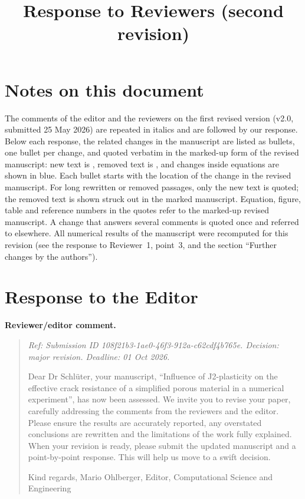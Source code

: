 \documentclass[pdflatex,sn-mathphys-num]{sn-jnl}
\title{Response to Reviewers (second revision)}
\author*[1]{\fnm{Alexander} \sur{Schl\"uter}}
\author[1]{\fnm{Ronjit} \sur{Medda}}
\author[1]{\fnm{Ralf} \sur{M\"uller}}
\affil*[1]{\orgdiv{Institut f\"ur Mechanik, FB Bau- und Umweltingenieurwissenschaften}, \orgname{TU Darmstadt},
  \orgaddress{\street{Franziska-Braun-Stra{\ss}e 7}, \city{Darmstadt}, \postcode{64287}, \country{Germany}}}
\newcommand{\changed}[1]{\begingroup\color{blue}#1\endgroup}
\newenvironment{reviewercomment}
  {\par\noindent\textbf{Reviewer/editor comment.}\begin{quote}\itshape}
  {\end{quote}}
\begin{document}
\maketitle
\setlength{\parindent}{0pt}
\setlength{\parskip}{0.45\baselineskip}

\section*{Notes on this document}

The comments of the editor and the reviewers on the first revised version (v2.0, submitted 25 May 2026) are repeated
in italics and are followed by our response. Below each response, the related changes in the manuscript are listed as
bullets, one bullet per change, and quoted verbatim in the marked-up form of the revised manuscript: new text is
, removed text is , and changes inside equations are shown in \changed{blue}.
Each bullet starts with the location of the change in the revised manuscript. For long rewritten or removed
passages, only the new text is quoted; the removed text is shown struck out in the marked manuscript. Equation,
figure, table and reference numbers in the quotes refer to the marked-up revised manuscript. A change that answers several comments is quoted once
and referred to elsewhere. All numerical results of the manuscript were recomputed for this revision (see the response
to Reviewer~1, point~3, and the section ``Further changes by the authors'').

\section*{Response to the Editor}

\begin{reviewercomment}
Ref: Submission ID 108f21b3-1ae0-46f3-912a-c62cdf4b765e. Decision: major revision. Deadline: 01 Oct 2026.

Dear Dr Schl\"uter, your manuscript, ``Influence of J2-plasticity on the effective crack resistance of a simplified
porous material in a numerical experiment'', has now been assessed. We invite you to revise your paper, carefully
addressing the comments from the reviewers and the editor. Please ensure the results are accurately reported, any
overstated conclusions are rewritten and the limitations of the work fully explained. When your revision is ready,
please submit the updated manuscript and a point-by-point response. This will help us move to a swift decision.

Kind regards, Mario Ohlberger, Editor, Computational Science and Engineering
\end{reviewercomment}
\end{document}
